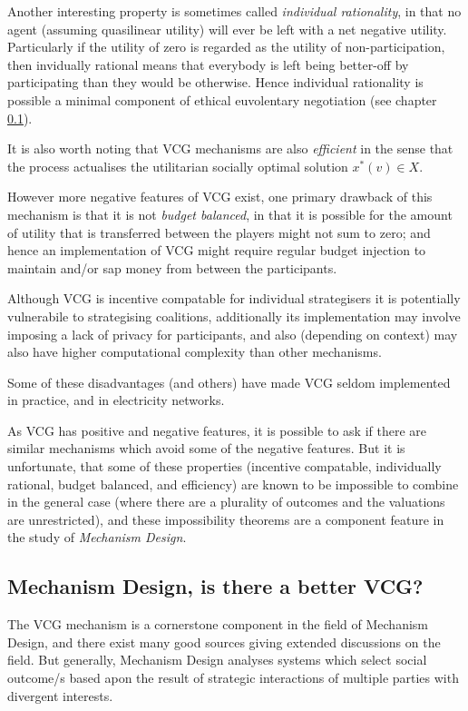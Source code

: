 Another interesting property is sometimes called \textit{individual rationality}, in that no agent (assuming quasilinear utility) will ever be left with a net negative utility. Particularly if the utility of zero is regarded as the utility of non-participation, then invidually rational means that everybody is left being better-off by participating than they would be otherwise. Hence individual rationality is possible a minimal component of ethical euvolentary negotiation (see chapter \ref{}).

It is also worth noting that VCG mechanisms are also \textit{efficient} in the sense that the process actualises the utilitarian socially optimal solution $x^*(v) \in X$.

However more negative features of VCG exist, one primary drawback of this mechanism is that it is not \textit{budget balanced}, in that it is possible for the amount of utility that is transferred between the players might not sum to zero; and hence an implementation of VCG might require regular budget injection to maintain and/or sap money from between the participants.

Although VCG is incentive compatable for individual strategisers it is potentially vulnerabile to strategising coalitions, additionally its implementation may involve imposing a lack of privacy for participants, and also (depending on context) may also have higher computational complexity than other mechanisms.\cite{ShohamLeytonBrown09}

Some of these disadvantages (and others) have made VCG seldom implemented in practice, and in electricity networks.\cite{Rothkopf07, Ausubel2006}

As VCG has positive and negative features, it is possible to ask if there are similar mechanisms which avoid some of the negative features.
But it is unfortunate, that some of these properties (incentive compatable, individually rational, budget balanced, and efficiency) are known to be impossible to combine in the general case (where there are a plurality of outcomes and the valuations are unrestricted), and these impossibility theorems are a component feature in the study of \textit{Mechanism Design}.%

\subsection{Mechanism Design, is there a better VCG?}

The VCG mechanism is a cornerstone component in the field of Mechanism Design, and there exist many good sources giving extended discussions on the field.\cite{37377}
But generally, Mechanism Design analyses systems which select social outcome/s based apon the result of strategic interactions of multiple parties with divergent interests.%

